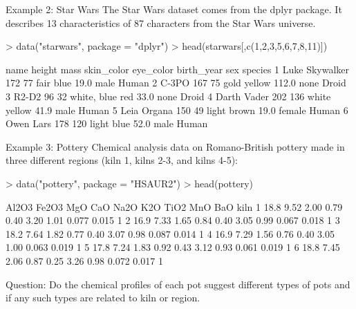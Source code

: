 \documentclass[11pt,handout,aspectratio=169]{beamer}
\begin{document}
\begin{frame}[fragile]{Example 2: Star Wars}
The Star Wars dataset comes from the dplyr package. It describes 13 characteristics of 87 characters from the Star Wars universe.
\scriptsize
\begin{Schunk}
\begin{Sinput}
> data("starwars", package = "dplyr")
> head(starwars[,c(1,2,3,5,6,7,8,11)])
\end{Sinput}
\begin{Soutput}
            name height mass  skin_color eye_color birth_year    sex species
1 Luke Skywalker    172   77        fair      blue       19.0   male   Human
2          C-3PO    167   75        gold    yellow      112.0   none   Droid
3          R2-D2     96   32 white, blue       red       33.0   none   Droid
4    Darth Vader    202  136       white    yellow       41.9   male   Human
5    Leia Organa    150   49       light     brown       19.0 female   Human
6      Owen Lars    178  120       light      blue       52.0   male   Human
\end{Soutput}
\end{Schunk}
\end{frame}

\begin{frame}[fragile]{Example 3: Pottery}
Chemical analysis data on Romano-British pottery made in three different regions (kiln 1, kilns 2-3, and kilns 4-5):{\scriptsize
\begin{Schunk}
\begin{Sinput}
> data("pottery", package = "HSAUR2")
> head(pottery)
\end{Sinput}
\begin{Soutput}
  Al2O3 Fe2O3  MgO  CaO Na2O  K2O TiO2   MnO   BaO kiln
1  18.8  9.52 2.00 0.79 0.40 3.20 1.01 0.077 0.015    1
2  16.9  7.33 1.65 0.84 0.40 3.05 0.99 0.067 0.018    1
3  18.2  7.64 1.82 0.77 0.40 3.07 0.98 0.087 0.014    1
4  16.9  7.29 1.56 0.76 0.40 3.05 1.00 0.063 0.019    1
5  17.8  7.24 1.83 0.92 0.43 3.12 0.93 0.061 0.019    1
6  18.8  7.45 2.06 0.87 0.25 3.26 0.98 0.072 0.017    1
\end{Soutput}
\end{Schunk}
}
Question: Do the chemical profiles of each pot suggest different types of pots and if any such types are related to kiln or region.
\end{frame}
\end{document}
